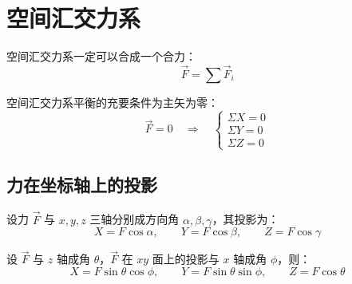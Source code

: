 
\section{空间汇交力系}

 空间汇交力系一定可以合成一个合力：
\begin{equation}
\vec{F}=\sum\vec{F}_i
\label{eq:3-汇交-合力}
\end{equation}

 空间汇交力系平衡的充要条件为主矢为零：
\begin{equation}
\vec{F}=0 \quad\Longrightarrow\quad
\begin{cases}
\Sigma X=0\\ \Sigma Y=0\\ \Sigma Z=0
\end{cases}
\label{eq:3-汇交-平衡}
\end{equation}

\subsection{力在坐标轴上的投影}

 设力 $\vec{F}$ 与 $x,y,z$ 三轴分别成方向角 $\alpha,\beta,\gamma$，其投影为：
\begin{equation}
X=F\cos\alpha,\qquad Y=F\cos\beta,\qquad Z=F\cos\gamma
\label{eq:3-汇交-一次投影}
\end{equation}

 设 $\vec{F}$ 与 $z$ 轴成角 $\theta$，$\vec{F}$ 在 $xy$ 面上的投影与 $x$ 轴成角 $\phi$，则：
\begin{equation}
X=F\sin\theta\cos\phi,\qquad Y=F\sin\theta\sin\phi,\qquad Z=F\cos\theta
\label{eq:3-汇交-二次投影}
\end{equation}

